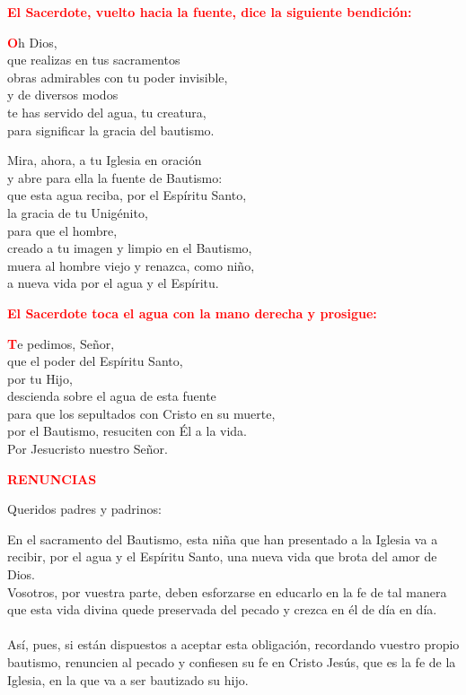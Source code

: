 \documentclass[12pt, letterpaper]{report}
\begin{document}
\large {\bfseries \textcolor{red}{El Sacerdote, vuelto hacia la fuente, dice la siguiente bendici\'on:}} \newline

\lettrine[lines=1]{\bfseries \textcolor{red}{O}}{}\Large h Dios, \\
que realizas en tus sacramentos \\
obras admirables con tu poder invisible, \\
y de diversos modos \\
te has servido del agua, tu creatura, \\
para significar la gracia del bautismo. \newline

\newpage

\Large Mira, ahora, a tu Iglesia en oraci\'on \\
y abre para ella la fuente de Bautismo: \\
que esta agua reciba, por el Esp\'iritu Santo, \\
la gracia de tu Unig\'enito, \\
para que el hombre, \\
creado a tu imagen y limpio en el Bautismo, \\
muera al hombre viejo y renazca, como ni\~no, \\
a nueva vida por el agua y el Esp\'iritu. \newline

\large {\bfseries \textcolor{red}{El Sacerdote toca el agua con la mano derecha y prosigue:}}

\lettrine[lines=1]{\bfseries \textcolor{red}{T}}{}\Large e pedimos, Se\~nor, \\
que el poder del Esp\'iritu Santo, \\
por tu Hijo, \\
descienda sobre el agua de esta fuente \\
para que los sepultados con Cristo en su muerte, \\
por el Bautismo, resuciten con \'El a la vida. \\
Por Jesucristo nuestro Se\~nor. \newline

\Large {\bfseries \textcolor{red}{RENUNCIAS}} \newline

\Large Queridos padres y padrinos: \newline

\Large En el sacramento del Bautismo, esta ni\~na que han presentado a la Iglesia va a recibir, por el agua y el Esp\'iritu Santo, una nueva vida que brota del amor de Dios.\\
Vosotros, por vuestra parte, deben esforzarse en educarlo en la fe de tal manera que esta vida divina quede preservada del pecado y crezca en \'el de d\'ia en d\'ia. \\ \\
As\'i, pues, si est\'an dispuestos a aceptar esta obligaci\'on, recordando vuestro propio bautismo, renuncien al pecado y confiesen su fe en Cristo Jes\'us, que es la fe de la Iglesia, en la que va a ser bautizado su hijo. \newline
\end{document}
